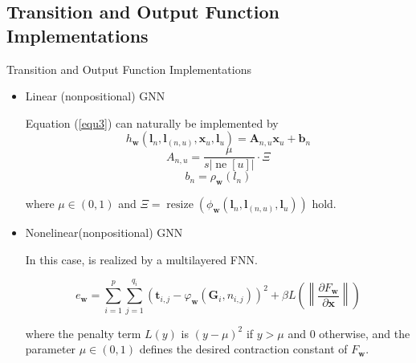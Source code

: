 \documentclass[10pt,aspectratio=169]{beamer}
\begin{document}
\subsection{Transition and Output Function Implementations}
\begin{frame}[allowframebreaks]{Transition and Output Function Implementations}
\begin{itemize}
    \item Linear (nonpositional) GNN
    
    Equation (\ref{equ3}) can naturally be implemented by
    \begin{equation}
        h_{\boldsymbol{w}}\left(\boldsymbol{l}_{n}, \boldsymbol{l}_{(n, u)}, \boldsymbol{x}_{u}, \boldsymbol{l}_{u}\right)=\boldsymbol{A}_{n, u} \boldsymbol{x}_{u}+\boldsymbol{b}_{n}        
    \end{equation}
    \begin{equation}
        A_{n, u} =\frac{\mu}{s|\operatorname{ne}[u]|} \cdot \Xi
    \end{equation}
    \begin{equation}
        b_{n} =\rho_{\boldsymbol{w}}\left(l_{n}\right)        
    \end{equation}    

    where $\mu \in(0,1)$ and $\Xi=\operatorname{resize}\left(\phi_{\boldsymbol{w}}\left(\boldsymbol{l}_{n}, \boldsymbol{l}_{(n, u)}, \boldsymbol{l}_{u}\right)\right)$ hold.

\framebreak

    \item Nonelinear(nonpositional) GNN

    In this case, is realized by a multilayered FNN.

    \begin{equation}
        e_{\boldsymbol{w}}=\sum_{i=1}^{p} \sum_{j=1}^{q_{i}}\left(\boldsymbol{t}_{i, j}-\varphi_{\boldsymbol{w}}\left(\boldsymbol{G}_{i}, n_{i, j}\right)\right)^{2}+\beta L\left(\left\|\frac{\partial F_{\boldsymbol{w}}}{\partial \boldsymbol{x}}\right\|\right)
    \end{equation}

    where the penalty term $L(y)$ is $(y-\mu)^{2}$ if $y>\mu$ and 0 otherwise, and the parameter $\mu \in(0,1)$ defines the desired contraction constant of $F_{\boldsymbol{w}}$.

\end{itemize}
\end{frame}
\end{document}
